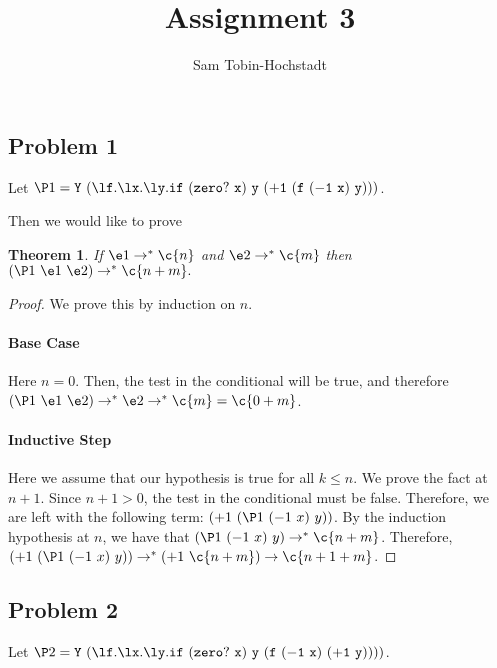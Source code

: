 \documentclass{article}[12pt]
\newtheorem{theorem}{Theorem}
\begin{document}
\title{Assignment 3}
\author{Sam Tobin-Hochstadt}

\newmeta{}

\maketitle


\subsection*{Problem 1}

Let $\P1 = \mathtt{Y\ (\l f.\l x. \l y.if\ (zero?\ x)\ y\ (+1\ (f\
  (-1\ x)\ y)))}$.

Then we would like to prove

\begin{theorem}
If $\e1 \rightarrow^* \c{n}$ and $\e2 \rightarrow^* \c{m}$ then $(\P1\
\e1\ \e2) \rightarrow^* \c{n+m}.$
\end{theorem}

\begin{proof}
  We prove this by induction on $n$.  

\paragraph{Base Case}  Here $n=0$.  Then, the test in the conditional
will be true, and therefore $(\P1\
\e1\ \e2) \rightarrow^* \e2 \rightarrow^* \c{m} = \c{0+m}$.

\paragraph{Inductive Step} Here we assume that our hypothesis is true
for all $k \leq n$.  We prove the fact at $n+1$.  Since $n+1 > 0$, the
test in the conditional must be false.  Therefore, we are left with
the following term: $(+1\ (\P1\ (-1\ x)\ y))$.  By the induction
hypothesis at $n$, we have that $(\P1\ (-1\ x)\ y) \rightarrow^*
\c{n+m}$.  Therefore,  $(+1\ (\P1\ (-1\ x)\ y)) \rightarrow^* (+1\
\c{n+m}) \rightarrow \c{n+1+m}$.

\end{proof}

\subsection*{Problem 2}


Let $\P2 = \mathtt{Y\ (\l f.\l x. \l y.if\ (zero?\ x)\ y\ (f\
  (-1\ x)\ (+1\ y))))}$.
\end{document}
